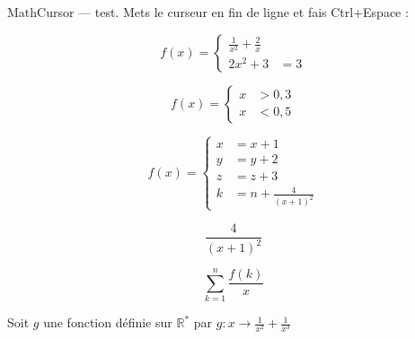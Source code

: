\documentclass{article}
\begin{document}
MathCursor — test. Mets le curseur en fin de ligne et fais Ctrl+Espace :


\[
f(x)= \left\{ \begin{aligned}
\frac{1}{x^{2}}+\frac{2}{x} & \\
2x^{2}+3 &=3
\end{aligned} \right.
\]

\[
f(x)= \left\{ \begin{aligned}
x &>0,3 \\
x &<0,5
\end{aligned} \right.
\]

\[
f(x)= \left\{ \begin{aligned}
x &=x+1 \\
y &=y+2 \\
z &=z+3 \\
k &=n+\frac{4}{(x+1)^{2}}
\end{aligned} \right.
\]

\[\frac{4}{(x+1)^{2}}\]


\[\sum_{k=1}^{n} \frac{f(k)}{x}\]

Soit $g$ une fonction définie sur $\mathbb{R} ^{\ast }$ par $\displaystyle g\colon x\to \frac{1}{x^{2}}+\frac{1}{x^{3}}$


\end{document}
